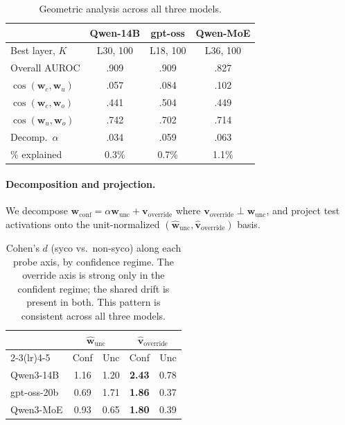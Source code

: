 \documentclass[11pt]{article}
\begin{document}
\begin{table}[t]
\caption{Geometric analysis across all three models.}
\label{tab:geometry}
\begin{center}
\begin{small}
\begin{tabular}{lccc}
\toprule
 & Qwen-14B & gpt-oss & Qwen-MoE \\
\midrule
Best layer, $K$ & L30, 100 & L18, 100 & L36, 100 \\
Overall AUROC & .909 & .909 & .827 \\
\midrule
$\cos(\mathbf{w}_c, \mathbf{w}_u)$ & .057 & .084 & .102 \\
$\cos(\mathbf{w}_c, \mathbf{w}_o)$ & .441 & .504 & .449 \\
$\cos(\mathbf{w}_u, \mathbf{w}_o)$ & .742 & .702 & .714 \\
\midrule
Decomp.\ $\alpha$ & .034 & .059 & .063 \\
$\%$ explained & 0.3\% & 0.7\% & 1.1\% \\
\bottomrule
\end{tabular}
\end{small}
\end{center}
\end{table}

\paragraph{Decomposition and projection.}
We decompose $\mathbf{w}_{\text{conf}} = \alpha \mathbf{w}_{\text{unc}} + \mathbf{v}_{\text{override}}$ where $\mathbf{v}_{\text{override}} \perp \mathbf{w}_{\text{unc}}$, and project test activations onto the unit-normalized $(\hat{\mathbf{w}}_{\text{unc}}, \hat{\mathbf{v}}_{\text{override}})$ basis.

\begin{table}[t]
\caption{Cohen's $d$ (syco vs.\ non-syco) along each probe axis, by confidence regime. The override axis is strong only in the confident regime; the shared drift is present in both. This pattern is consistent across all three models.}
\label{tab:cohens_d}
\begin{center}
\begin{small}
\begin{tabular}{lcccc}
\toprule
 & \multicolumn{2}{c}{$\hat{\mathbf{w}}_{\text{unc}}$} & \multicolumn{2}{c}{$\hat{\mathbf{v}}_{\text{override}}$} \\
\cmidrule(lr){2-3}\cmidrule(lr){4-5}
 & Conf & Unc & Conf & Unc \\
\midrule
Qwen3-14B   & 1.16 & 1.20 & \textbf{2.43} & 0.78 \\
gpt-oss-20b & 0.69 & 1.71 & \textbf{1.86} & 0.37 \\
Qwen3-MoE   & 0.93 & 0.65 & \textbf{1.80} & 0.39 \\
\bottomrule
\end{tabular}
\end{small}
\end{center}
\end{table}
\end{document}
